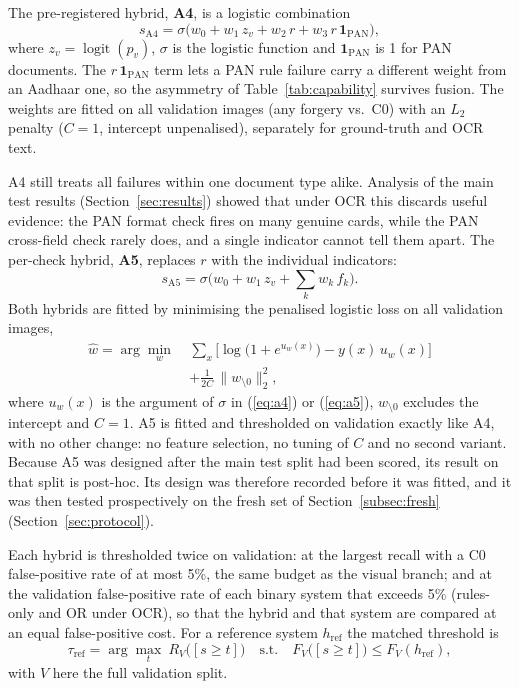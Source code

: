 \documentclass[VANCOUVER,Times1COL]{WileyNJDv5}
\begin{document}
The pre-registered hybrid, \textbf{A4}, is a logistic combination
\begin{equation}
\label{eq:a4}
s_{\mathrm{A4}} = \sigma\big(w_0 + w_1\,z_v + w_2\,r + w_3\,r\,\mathbf{1}_{\mathrm{PAN}}\big),
\end{equation}
where $z_v=\operatorname{logit}(p_v)$, $\sigma$ is the logistic function
and $\mathbf{1}_{\mathrm{PAN}}$ is 1 for PAN documents. The
$r\,\mathbf{1}_{\mathrm{PAN}}$ term lets a PAN rule failure carry
a different weight from an Aadhaar one, so the asymmetry of
Table~\ref{tab:capability} survives fusion. The weights are fitted on
all validation images (any forgery vs.\ C0) with an $L_2$ penalty
($C=1$, intercept unpenalised), separately for ground-truth and OCR
text.

A4 still treats all failures within one document type alike. Analysis
of the main test results (Section~\ref{sec:results}) showed that under
OCR this discards useful evidence: the PAN format check fires on many
genuine cards, while the PAN cross-field check rarely does, and a single
indicator cannot tell them apart. The per-check hybrid, \textbf{A5},
replaces $r$ with the individual indicators:
\begin{equation}
\label{eq:a5}
s_{\mathrm{A5}} = \sigma\Big(w_0 + w_1\,z_v + \textstyle\sum_{k} w_{k}\,f_k\Big).
\end{equation}
Both hybrids are fitted by minimising the penalised logistic loss on
all validation images,
\begin{equation}
\label{eq:fit}
\begin{aligned}
\hat{w}=\arg\min_{w}\ &\sum_{x}\Big[\log\big(1+e^{u_w(x)}\big)-y(x)\,u_w(x)\Big]\\
&+\frac{1}{2C}\,\lVert w_{\setminus 0}\rVert_2^2,
\end{aligned}
\end{equation}
where $u_w(x)$ is the argument of $\sigma$ in (\ref{eq:a4}) or
(\ref{eq:a5}), $w_{\setminus 0}$ excludes the intercept and $C=1$.
A5 is fitted and thresholded on validation exactly like A4, with no
other change: no feature selection, no tuning of $C$ and no second
variant. Because A5 was designed after the main test split had been
scored, its result on that split is post-hoc. Its design was therefore
recorded before it was fitted, and it was then tested prospectively on
the fresh set of Section~\ref{subsec:fresh}
(Section~\ref{sec:protocol}).

Each hybrid is thresholded twice on validation: at the largest recall
with a C0 false-positive rate of at most 5\%, the same budget as the
visual branch; and at the validation false-positive rate of each
binary system that exceeds 5\% (rules-only and OR under OCR), so that
the hybrid and that system are compared at an equal false-positive
cost. For a reference system $h_{\mathrm{ref}}$ the matched threshold is
\begin{equation}
\label{eq:matched}
\tau_{\mathrm{ref}}=\arg\max_{t}\ R_{V}\big([s\ge t]\big)
\quad\text{s.t.}\quad F_{V}\big([s\ge t]\big)\le F_{V}(h_{\mathrm{ref}}),
\end{equation}
with $V$ here the full validation split.
\end{document}

